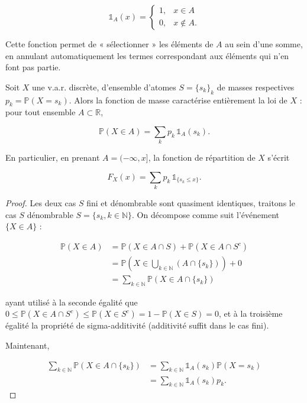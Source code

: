 $$
\mathbb{1}_A(x) = \begin{cases} 1, & x \in A \\ 0, & x \notin A. \end{cases}
$$

Cette fonction permet de « sélectionner » les éléments de $A$ au sein d'une somme, en annulant automatiquement les termes correspondant aux éléments qui n'en font pas partie. 

\medskip

\begin{mdframed}
\begin{proposition}
Soit $X$ une v.a.r. discrète, d'ensemble d'atomes $S = \{s_k\}_k$ de masses respectives $p_k = \mathbb{P}(X = s_k)$. Alors la fonction de masse caractérise entièrement la loi de $X$ : pour tout ensemble $A \subset \mathbb{R}$,

$$
\mathbb{P}(X \in A) = \sum_k p_k \, \mathbb{1}_A(s_k).
$$

En particulier, en prenant $A = (-\infty, x]$, la fonction de répartition de $X$ s'écrit

$$
F_X(x) = \sum_k p_k \, \mathbb{1}_{\{s_k \leq x\}}.
$$
\end{proposition}
\end{mdframed}

\begin{proof}
Les deux cas $S$ fini et dénombrable sont quasiment identiques, traitons le cas $S$ dénombrable $S = \{s_k, k \in \mathbb{N}\}$. On décompose comme suit l'événement $\{X \in A\}$ :

\begin{align*}
\mathbb{P}(X \in A) &= \mathbb{P}(X \in A \cap S) + \mathbb{P}(X \in A \cap S^c) \\
&= \mathbb{P}\left(X \in \bigcup_{k \in \mathbb{N}} (A \cap \{s_k\})\right) + 0 \\
&= \sum_{k \in \mathbb{N}} \mathbb{P}(X \in A \cap \{s_k\})
\end{align*}

ayant utilisé à la seconde égalité que $0 \leq \mathbb{P}(X \in A \cap S^c) \leq \mathbb{P}(X \in S^c) = 1 - \mathbb{P}(X \in S) = 0$, et à la troisième égalité la propriété de sigma-additivité (additivité suffit dans le cas fini).

Maintenant,

\begin{align*}
\sum_{k \in \mathbb{N}} \mathbb{P}(X \in A \cap \{s_k\}) &= \sum_{k \in \mathbb{N}} \mathbb{1}_A(s_k)\mathbb{P}(X = s_k) \\
&= \sum_{k \in \mathbb{N}} \mathbb{1}_A(s_k)p_k.
\end{align*}
\end{proof}

